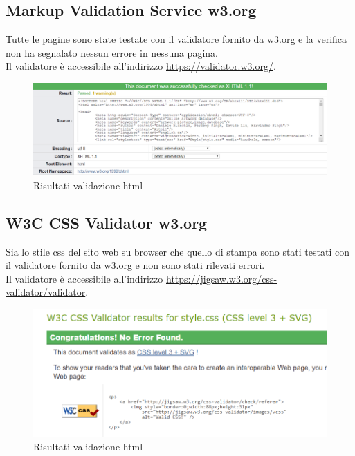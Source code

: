 \documentclass[openany, a4paper, 12pt]{report}
\begin{document}
			\subsection{Markup Validation Service w3.org}
				Tutte le pagine sono state testate con il validatore fornito da w3.org e la verifica non ha segnalato nessun errore in nessuna pagina.\\
				Il validatore è accessibile all'indirizzo \url{https://validator.w3.org/}.\\
			\begin{figure}[H]
				\centering
				\includegraphics[width=0.8\linewidth]{images/validazione_html}
				\caption{Risultati validazione html}
			\end{figure}
			\subsection{W3C CSS Validator w3.org}
				Sia lo stile css del sito web su browser che quello di stampa sono stati testati con il validatore fornito da w3.org e non sono stati rilevati errori.\\
Il validatore è accessibile all'indirizzo \url{https://jigsaw.w3.org/css-validator/validator}.\\
			\begin{figure}[H]
				\centering
				\includegraphics[width=0.8\linewidth]{images/validazione_css}
				\caption{Risultati validazione html}
			\end{figure}
\end{document}
